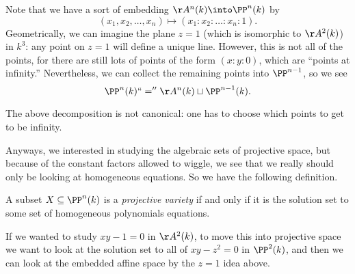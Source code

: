 Note that we have a sort of embedding $\AA^n(k)\into\PP^n(k)$ by
\[(x_1,x_2,\ldots,x_n)\mapsto(x_1:x_2:\ldots:x_n:1).\]
Geometrically, we can imagine the plane $z=1$ (which is isomorphic to $\AA^2(k)$) in $k^3$: any point on $z=1$ will define a unique line. However, this is not all of the points, for there are still lots of points of the form $(x:y:0)$, which are ``points at infinity.'' Nevertheless, we can collect the remaining points into $\PP^{n-1}$, so we see
\[\PP^n(k)``=''\AA^n(k)\sqcup\PP^{n-1}(k).\]
\begin{remark}
	The above decomposition is not canonical: one has to choose which points to get to be infinity.
\end{remark}

Anyways, we interested in studying the algebraic sets of projective space, but because of the constant factors allowed to wiggle, we see that we really should only be looking at homogeneous equations. So we have the following definition.
\begin{definition}
	A subset $X\subseteq\PP^n(k)$ is a \textit{projective variety} if and only if it is the solution set to some set of homogeneous polynomials equations.
\end{definition}
\begin{example}
	If we wanted to study $xy-1=0$ in $\AA^2(k)$, to move this into projective space we want to look at the solution set to all of $xy-z^2=0$ in $\PP^2(k)$, and then we can look at the embedded affine space by the $z=1$ idea above.
\end{example}

